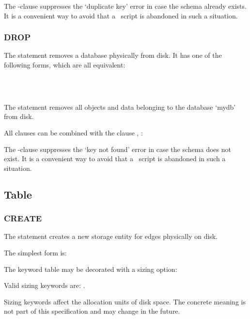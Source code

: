 The -clause
suppresses the `duplicate key' error
in case the schema
already exists.
It is a convenient way to avoid
that a \sql\ script is abandoned
in such a situation.

\subsubsection{DROP}
The  statement
removes a database physically from disk.
It has one of the following forms,
which are all equivalent:

 \\
 \\
 

The statement removes all objects and data
belonging to the database `mydb' from disk.

All  clauses can be combined
with the clause , \eg:

  

The -clause
suppresses the `key not found' error
in case the schema
does not exist.
It is a convenient way to avoid
that a \sql\ script is abandoned
in such a situation.


\subsection{Table}
\subsubsection{CREATE}
The  statement
creates a new storage entity for edges
physically on disk.

The simplest form is:

 

The keyword table may be decorated
with a sizing option:

 

Valid sizing keywords are:
.

Sizing keywords affect the allocation units
of disk space. The concrete meaning is not
part of this specification and may change
in the future.

